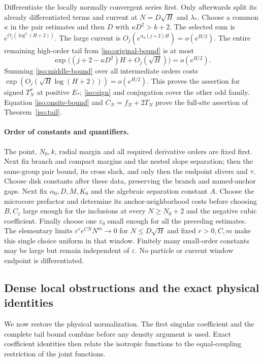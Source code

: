 \documentclass[11pt]{article}
\numberwithin{equation}{section}
\theoremstyle{definition}
\newcommand{\eps}{\varepsilon}
\begin{document}
Differentiate the locally normally convergent series first. Only
afterwards split its already differentiated terms and current at
$N=D\sqrt H$ and $\lambda_*$.
Choose a common $\kappa$ in the pair estimates and then
$D$ with $\kappa D^2>k+2$.
The selected sum is $e^{O_j(\log^2(H+2))}$.
The large current is $O_j(e^{\alpha_0(j+2)H})=o(e^{H/2})$.
The entire remaining high-order tail from \eqref{iso:original-bound}
is at most
\[
 \exp\bigl((j+2-\kappa D^2)H+O_j(\sqrt H)\bigr)=o(e^{H/2}).
\]
Summing \eqref{iso:middle-bound} over all intermediate orders costs
$\exp(O_j(\sqrt H\log(H+2)))=o(e^{H/2})$.
This proves the assertion for signed $T_N^\sigma$ at positive $E_*$;
\eqref{iso:sign} and conjugation cover the other odd family.
Equation \eqref{iso:onsite-bound} and $C_N=f_N+2T_N$ prove the
full-site assertion of Theorem~\ref{iso:tail}.

\paragraph{Order of constants and quantifiers.}
The point, $N_0,k$, radial margin and all required derivative orders are
fixed first. Next fix branch and compact margins and the nested slope
separation; then the same-group pair bound, its cross slack, and only
then the endpoint slivers and $\tau$. Choose disk constants after these
data, preserving the branch and named-anchor gaps. Next fix
$\alpha_0,D,M,K_0$ and the algebraic separation constant $A$.
Choose the microcore prefactor and determine its anchor-neighborhood
costs before choosing $B,C_1$ large enough for the inclusions at every
$N\ge N_0+2$ and the negative cubic coefficient. Finally choose one
$\eps_0$ small enough for all the preceding estimates. The elementary
limits $\eps^r e^{CN}N^m\to0$ for $N\le D\sqrt H$ and fixed
$r>0,C,m$ make this single choice uniform in that window.
Finitely many small-order constants may be large but remain independent
of $\eps$. No particle or current window endpoint is differentiated.

\subsection{Dense local obstructions and the exact physical identities}

We now restore the physical normalization. The first singular
coefficient and the complete tail bound combine before any density
argument is used. Exact coefficient identities then relate the
isotropic functions to the equal-coupling restriction of the joint
functions.
\end{document}
